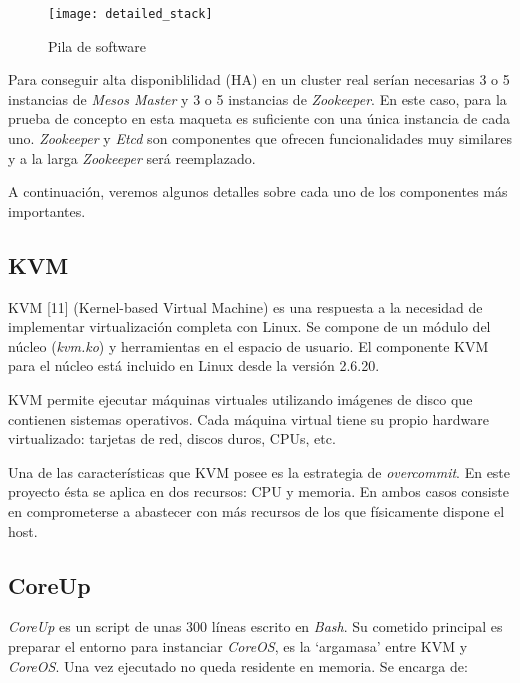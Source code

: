 \documentclass[a4paper,12pt,spanish,final]{epsc_tfc_pfc}
\begin{document}
\begin{figure}[h]
  \centering
    \texttt{[image: detailed\_stack]}
      \caption{Pila de software}
\end{figure}

Para conseguir alta disponiblilidad (HA) en un cluster real serían necesarias 3 o 5 instancias de \emph{Mesos Master} y 3 o 5 instancias de \emph{Zookeeper}. En este caso, para la prueba de concepto en esta maqueta es suficiente con una única instancia de cada uno. \emph{Zookeeper} y \emph{Etcd} son componentes que ofrecen funcionalidades muy similares y a la larga \emph{Zookeeper} será reemplazado.

A continuación, veremos algunos detalles sobre cada uno de los componentes más importantes.

\subsection{KVM}

KVM [11] (Kernel-based Virtual Machine) es una respuesta a la necesidad de implementar virtualización completa con Linux. Se compone de un módulo del núcleo (\emph{kvm.ko}) y herramientas en el espacio de usuario. El componente KVM para el núcleo está incluido en Linux desde la versión 2.6.20.

KVM permite ejecutar máquinas virtuales utilizando imágenes de disco que contienen sistemas operativos. Cada máquina virtual tiene su propio hardware virtualizado: tarjetas de red, discos duros, CPUs, etc.

Una de las características que KVM posee es la estrategia de \emph{overcommit}. En este proyecto ésta se aplica en dos recursos: CPU y memoria. En ambos casos consiste en comprometerse a abastecer con más recursos de los que físicamente dispone el host.

\subsection{CoreUp}

\emph{CoreUp} es un script de unas 300 líneas escrito en \emph{Bash}. Su cometido principal es preparar el entorno para instanciar \emph{CoreOS}, es la `argamasa' entre KVM y \emph{CoreOS}. Una vez ejecutado no queda residente en memoria. Se encarga de:
\end{document}

